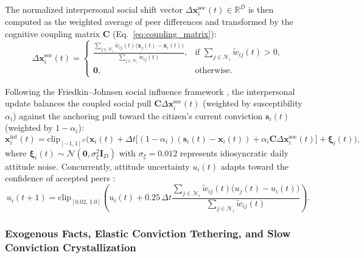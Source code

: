 The normalized interpersonal social shift vector $\Delta \mathbf{x}_i^{\mathrm{soc}}(t) \in \mathbb{R}^D$ is then computed as the weighted average of peer differences and transformed by the cognitive coupling matrix $\mathbf{C}$ (Eq.~\eqref{eq:coupling_matrix}):
\begin{equation}
    \Delta \mathbf{x}_i^{\mathrm{soc}}(t) =
    \begin{cases}
        \displaystyle \frac{\sum_{j \in \mathcal{N}_i} \tilde{w}_{ij}(t) \big(\mathbf{x}_j(t) - \mathbf{x}_i(t)\big)}{\sum_{j \in \mathcal{N}_i} \tilde{w}_{ij}(t)}, & \text{if } \sum_{j \in \mathcal{N}_i} \tilde{w}_{ij}(t) > 0, \\[10pt]
        \mathbf{0}, & \text{otherwise}.
    \end{cases}
    \label{eq:social_shift}
\end{equation}

Following the Friedkin--Johnsen social influence framework \citep{friedkin1990social, parsegov2017novel}, the interpersonal update balances the coupled social pull $\mathbf{C}\Delta \mathbf{x}_i^{\mathrm{soc}}(t)$ (weighted by susceptibility $\alpha_i$) against the anchoring pull toward the citizen's current conviction $\mathbf{s}_i(t)$ (weighted by $1 - \alpha_i$):
\begin{equation}
    \mathbf{x}_i^{\mathrm{int}}(t) = \mathrm{clip}_{[-1, 1]^D}\!\Big(
        \mathbf{x}_i(t) + \Delta t \big[(1 - \alpha_i)(\mathbf{s}_i(t) - \mathbf{x}_i(t)) + \alpha_i \mathbf{C}\Delta \mathbf{x}_i^{\mathrm{soc}}(t)\big] + \boldsymbol{\xi}_i(t)
    \Big),
    \label{eq:fj_interpersonal_update}
\end{equation}
where $\boldsymbol{\xi}_i(t) \sim \mathcal{N}(\mathbf{0}, \sigma_{\xi}^2 \mathbf{I}_D)$ with $\sigma_{\xi} = 0.012$ represents idiosyncratic daily attitude noise. Concurrently, attitude uncertainty $u_i(t)$ adapts toward the confidence of accepted peers \citep{deffuant2002how}:
\begin{equation}
    u_i(t+1) = \mathrm{clip}_{[0.02,\, 1.0]}\!\left(
        u_i(t) + 0.25\,\Delta t \frac{\sum_{j \in \mathcal{N}_i} \tilde{w}_{ij}(t)\big(u_j(t) - u_i(t)\big)}{\sum_{j \in \mathcal{N}_i} \tilde{w}_{ij}(t)}
    \right).
    \label{eq:uncertainty_update}
\end{equation}

\subsubsection{Exogenous Facts, Elastic Conviction Tethering, and Slow Conviction Crystallization}
\label{subsubsec:facts_and_tether}

